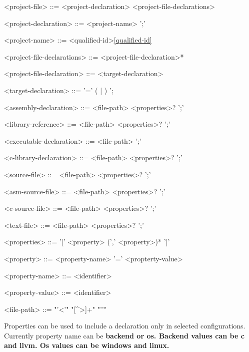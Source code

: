 \documentclass[a4paper,oneside,11pt]{article}
\begin{document}
\begin{grammar}
<project-file> ::= <project-declaration> <project-file-declarations>

<project-declaration> ::=  <project-name> ';'

<project-name> ::= <qualified-id>\ref{qualified-id}

<project-file-declarations> ::= <project-file-declaration>*

<project-file-declaration> ::= <target-declaration>

<target-declaration> ::=  '=' ( | ) ';

<assembly-declaration> ::=  <file-path> <properties>? ';'

<library-reference> ::=  <file-path> <properties>? ';'

<executable-declaration> ::=  <file-path> ';'

<c-library-declaration> ::=  <file-path> <properties>? ';'

<source-file> ::=  <file-path> <properties>? ';'

<asm-source-file> ::=  <file-path> <properties>? ';'

<c-source-file> ::=  <file-path> <properties>? ';'

<text-file> ::=  <file-path> <properties>? ';'

<properties> ::= '[' <property> (',' <property>)* ']'

<property> ::= <property-name> '=' <propterty-value>

<property-name> ::= <identifier>

<property-value> ::= <identifier>

<file-path> ::= "'<'" "[^>]+" "'\>'"

\end{grammar}

Properties can be used to include a declaration only in selected
configurations.
Currently property name can be \bf{backend} or \bf{os}.
Backend values can be \bf{c} and \bf{llvm}.
Os values can be \bf{windows} and \bf{linux}.

\clearpage
\end{document}
